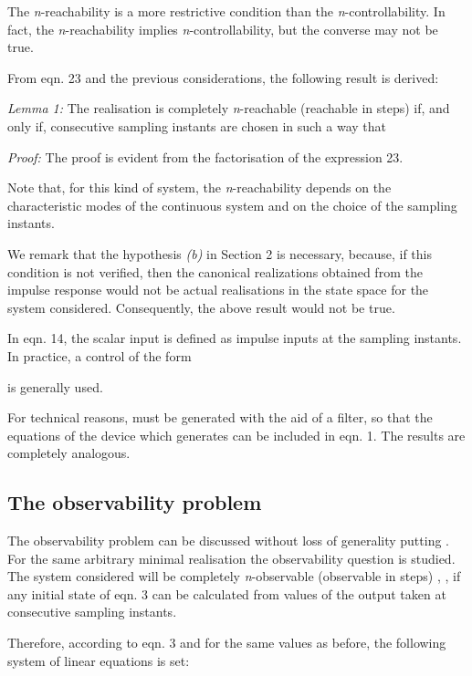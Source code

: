 \documentclass{article}
\begin{document}
The \textit{n}-reachability is a more restrictive condition than
the \textit{n}-controllability. In fact, the
\textit{n}-reachability implies \textit{n}-controllability, but
the converse may not be true.

From eqn. 23 and the previous considerations, the following result
is derived:

\textit{Lemma 1:} The realisation  is completely
\textit{n}-reachable (reachable in  steps) if, and only if, 
consecutive sampling instants are chosen in such a way that



\textit{Proof:} The proof is evident from the factorisation of the
expression 23.

Note that, for this kind of system, the \textit{n}-reachability
depends on the characteristic modes of the continuous system and
on the choice of the sampling instants.

We remark that the hypothesis \textit{(b)} in Section 2 is
necessary, because, if this condition is not verified, then the
canonical realizations obtained from the impulse response would
not be actual realisations in the state space for the system
considered. Consequently, the above result would not be true.

In eqn. 14, the scalar input is defined as impulse inputs at the
sampling instants. In practice, a control of the form



is generally used.

For technical reasons,  must be generated with the aid of a
filter, so that the equations of the device which generates 
can be included in eqn. 1. The results are completely analogous.


\subsection{The observability problem}

The observability problem can be discussed without loss of
generality putting . For the same arbitrary minimal
realisation  the observability question is studied. The
system considered will be completely \textit{n}-observable
(observable in  steps) \cite{Ackermann}, \cite{Troch}, if any
initial state  of eqn. 3 can be calculated from  values of
the output taken at  consecutive sampling instants.

Therefore, according to eqn. 3 and for the same values 
as before, the following system of linear equations is set:
\end{document}
